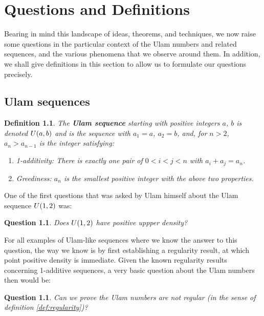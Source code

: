 \documentclass{report}
\newtheorem{question}[theorem]{Question}
\newtheorem{definition}[theorem]{Definition}
\theoremstyle{remark}
\numberwithin{equation}{section}
\begin{document}
\chapter{Questions and Definitions}

Bearing in mind this landscape of ideas, theorems, and techniques, we
now raise some questions in the particular context of the Ulam numbers
and related sequences, and the various phenomena that we observe
around them.  In addition, we shall give definitions in this section
to allow us to formulate our questions precisely.

\section{Ulam sequences}

\begin{definition}
  The \textbf{Ulam sequence} starting with positive integers $a$, $b$
  is denoted $U(a,b)$ and is the sequence with $a_1 = a$,
  $a_2 = b$, and, for $n > 2$, $a_n > a_{n-1}$ is the integer satisfying:
  \begin{enumerate}
  \item 1-additivity: There is exactly one pair of $0 < i < j < n$ with $a_i + a_j = a_n$.
  \item Greediness: $a_n$ is the smallest positive integer with the above two
    properties.
\end{enumerate}

\end{definition}

One of the first questions that was asked by Ulam himself about the
Ulam sequence $U(1,2)$ was: 

\begin{question}\label{qn:density}
  Does $U(1,2)$ have positive uppper density?
\end{question}

For all examples of Ulam-like sequences where we know the answer to
this question, the way we know is by first establishing a regularity
result, at which point positive density is immediate.  Given the known
regularity results concerning 1-additive sequences, a very basic
question about the Ulam numbers then would be:

\begin{question}\label{qn:irregular}
  Can we prove the Ulam numbers are not regular (in the sense of
  definition \ref{def:regularity})?
\end{question}
\end{document}
